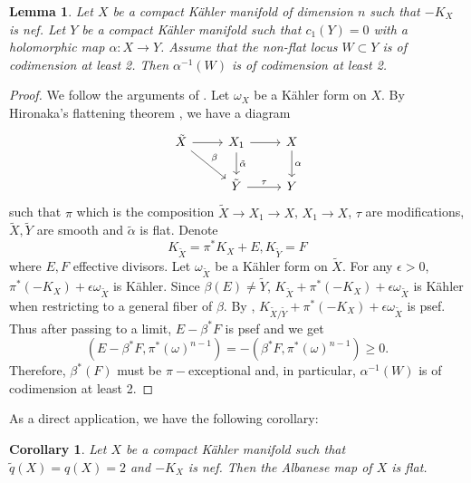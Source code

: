 \documentclass[a4, 12pt]{amsart}
\newtheorem{lem}[thm]{Lemma}
\newtheorem{cor}[thm]{Corollary}
\numberwithin{equation}{section}
\theoremstyle{definition}
\begin{document}
\begin{lem}\label{FlatLocus}
Let $X$ be a compact K\"ahler manifold of dimension $n$ such that $-K_X$ is nef.
Let $Y$ be a compact K\"ahler manifold such that $c_1(Y)=0$ with a holomorphic map $\alpha: X \to Y$.
Assume that the non-flat locus $W \subset Y$ is of codimension at least 2.
Then $\alpha^{-1}(W)$ is of codimension at least 2.
\end{lem}
\begin{proof}
We follow the arguments of  \cite[Lemma 3.2]{CH19}.
Let $\omega_X$ be a K\"ahler form on $X$.
By Hironaka's flattening theorem \cite{Hir75}, we have a diagram
$$
\begin{tikzcd}
\tilde{X} \arrow[rd, "\beta"] \arrow[r] & X_1 \arrow[r] \arrow[d, "\tilde{\alpha}"] & X \arrow[d, "\alpha"] \\
                                        & \tilde{Y} \arrow[r, "\tau"]            & Y                 
\end{tikzcd}
$$
such that $\pi$ which is the composition $\tilde{X} \to X_1 \to X$, $X_1 \to X$, $\tau$ are modifications, $\tilde{X}, \tilde{Y}$ are smooth and $\tilde{\alpha}$ is flat.
Denote
$$K_{\tilde{X}}=\pi^* K_X+E, K_{\tilde{Y}}=F$$
where $E,F$ effective divisors.
Let $\omega_{\tilde{X}}$ be a K\"ahler form on $\tilde{X}$.
For any $\epsilon >0$,
$\pi^*(-K_X)+\epsilon \omega_{\tilde{X}}$ is K\"ahler.
Since $\beta(E) \neq \tilde{Y}$,
$K_{\tilde{X}}+\pi^*(-K_X)+\epsilon \omega_{\tilde{X}}$
is K\"ahler when restricting to a general fiber of $\beta$.
By \cite[Theorem 1.1]{Pau12},
$K_{\tilde{X}/\tilde{Y}}+\pi^*(-K_X)+\epsilon \omega_{\tilde{X}}$
is psef.
Thus after passing to a limit,
$E-\beta^* F$ is psef and we get
$$(E-\beta^* F, \pi^* (\omega)^{n-1})=-(\beta^* F, \pi^* (\omega)^{n-1}) \geq 0.$$
Therefore, $\beta^*(F)$ must be $\pi-$exceptional and,
in particular, $\alpha^{-1}(W)$ is of codimension at least 2. 
\end{proof}
As a direct application, we have the following corollary:
\begin{cor}
Let $X$ be a compact K\"ahler manifold such that 
$\tilde{q}(X)=q(X)=2$ and
$-K_X$ is nef.
Then the Albanese map of $X$ is flat.
\end{cor}
\end{document}
